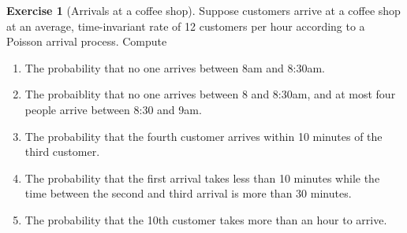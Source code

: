 \documentclass[11pt]{article}
\theoremstyle{definition}
\newtheorem{exercise}[]{Exercise}
\begin{document}

\begin{exercise}[Arrivals at a coffee shop]
Suppose customers arrive at a coffee shop at an average, time-invariant
rate of 12 customers per hour according to a Poisson arrival process.
%
%
%
Compute

\begin{enumerate}[label = (\alph*)]
  \item The probability that no one arrives between 8am and 8:30am.
  \item The probaiblity that no one arrives between 8 and 8:30am,
  and at most four people arrive between 8:30 and 9am.
  \item The probability that the fourth customer arrives within 10 minutes
  of the third customer.
  \item The probability that the first arrival takes less than 10 minutes
  while the time between the second and third arrival is more than 30 minutes.
  \item The probability that the 10th customer takes more than an hour to arrive.
\end{enumerate}

\end{exercise}
\end{document}
